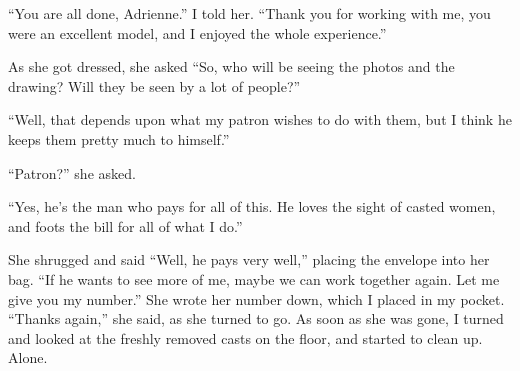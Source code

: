     ``You are all done, Adrienne.'' I told her. ``Thank you for working with me, you were an
excellent model, and I enjoyed the whole experience.''

    As she got dressed, she asked ``So, who will be seeing the photos and the drawing? Will they
be seen by a lot of people?''

    ``Well, that depends upon what my patron wishes to do with them, but I think he keeps them
pretty much to himself.''

    ``Patron?'' she asked.

    ``Yes, he's the man who pays for all of this. He loves the sight of casted women, and foots
the bill for all of what I do.''

    She shrugged and said ``Well, he pays very well,'' placing the envelope into her bag. ``If
he wants to see more of me, maybe we can work together again. Let me give you my number.'' She
wrote her number down, which I placed in my pocket. ``Thanks again,'' she said, as she turned to
go. As soon as she was gone, I turned and looked at the freshly removed casts on the floor, and
started to clean up. Alone.
